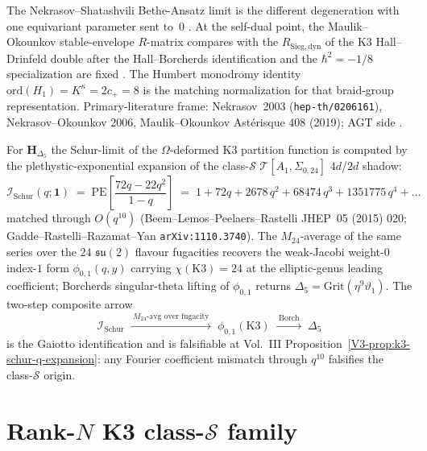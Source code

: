 \begin{remark}[Nekrasov $\Omega$-background on the bi-based datum;
self-dual phase $\epsilon_1 = -\epsilon_2$]
The Nekrasov--Shatashvili Bethe-Ansatz limit is the different
degeneration with one equivariant parameter sent to~$0$
\cite{NekrasovShatashvili2009}. At the self-dual point, the
Maulik--Okounkov stable-envelope $R$-matrix compares with the
$R_{\mathrm{Sieg,dyn}}$ of the K3 Hall--Drinfeld double after the
Hall--Borcherds identification and the $\hbar^2=-1/8$ specialization
are fixed \cite{MaulikOkounkov12,SchiffmannVasserot13}. The Humbert
monodromy identity $\mathrm{ord}(H_1) = K^\kappa = 2c_+ = 8$
is the matching normalization for that braid-group representation.
Primary-literature frame: Nekrasov~2003
(\texttt{hep-th/0206161}), Nekrasov--Okounkov 2006, Maulik--Okounkov
Ast\'erisque 408 (2019); AGT side
\cite{AGT09,AldayTachikawa10,CordovaGaiotto2016}.
\end{remark}

\begin{remark}
\label{rem:thqg-occ-character-match}
For $\mathbf{H}_{\Delta_5}$ the Schur-limit of the
$\Omega$-deformed K3 partition function is computed by the
plethystic-exponential expansion of the class-$\mathcal S$
$\mathcal{T}[A_1,\Sigma_{0,24}]$ $4d$/$2d$ shadow:
\[
 \mathcal I_{\mathrm{Schur}}(q;\mathbf 1)
 \;=\;
 \mathrm{PE}\!\left[\frac{72 q - 22 q^2}{1 - q}\right]
 \;=\;
 1 + 72 q + 2678\, q^2 + 68474\, q^3 + 1351775\, q^4 + \ldots
\]
matched through $O(q^{10})$ (Beem--Lemos--Peelaers--Rastelli
JHEP~05 (2015) 020; Gadde--Rastelli--Razamat--Yan
\texttt{arXiv:1110.3740}). The $M_{24}$-average of the same series
over the $24$ $\mathfrak{su}(2)$ flavour fugacities recovers the
weak-Jacobi weight-$0$ index-$1$ form $\phi_{0,1}(q,y)$ carrying
$\chi(\mathrm{K3}) = 24$ at the elliptic-genus leading coefficient;
Borcherds singular-theta lifting of $\phi_{0,1}$ returns
$\Delta_5 = \mathrm{Grit}(\eta^9\vartheta_1)$. The two-step composite
arrow
\[
 \mathcal I_{\mathrm{Schur}}
 \;\xrightarrow{\;M_{24}\text{-avg over fugacity}\;}\;
 \phi_{0,1}(\mathrm{K3})
 \;\xrightarrow{\;\mathrm{Borch}\;}\;
 \Delta_5
\]
is the Gaiotto identification and is falsifiable at
Vol.~III Proposition~\ref{V3-prop:k3-schur-q-expansion}: any Fourier
coefficient mismatch through $q^{10}$ falsifies the
class-$\mathcal S$ origin.
\end{remark}

\section{Rank-\texorpdfstring{$N$}{N} K3 class-\texorpdfstring{$\mathcal S$}{S} family}
\label{sec:thqg-occ-supplement-ii}

